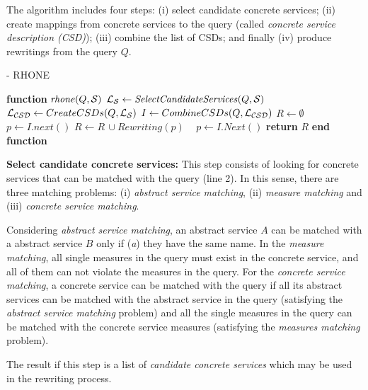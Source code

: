 The algorithm includes four steps: (i) select candidate concrete services; (ii)
create mappings from concrete services to the query (called \textit{concrete
service description (CSD)}); (iii) combine the list of CSDs; and finally (iv)
produce rewritings from the query $Q$.


\begin{algorithm}
\caption{ - RHONE}
\label{algo-rhone}

\begin{algorithmic}[1]
 
\STATE \textbf{function} $\mathit{rhone} (Q, \bigS)$
 \STATE  $\bigLS \leftarrow \mathit{SelectCandidateServices}(Q, \bigS)$ \label{rhone:buildPCD}
 \STATE  $\bigLCSD \leftarrow CreateCSDs(Q, \bigLS)$
 \STATE  $I \leftarrow CombineCSDs(Q, \bigLCSD)$
 \STATE $R\leftarrow \emptyset$
    \STATE $p \leftarrow I.next()$
  \STATE $R\leftarrow R\,\cup \mathit{Rewriting}(p)$
  \STATE ~\!
   \ENDIF
      \STATE $p \leftarrow I.\mathit{Next}()$
 \ENDWHILE
    \STATE \textbf{return} $R$
\STATE \textbf{end function}

\end{algorithmic}

\end{algorithm}


\noindent \textbf{Select candidate concrete services:} This step consists of
 looking for concrete services that can be matched with the query (line 2). In
 this sense, there are three matching problems: (i) \textit{abstract service
 matching}, (ii) \textit{measure matching} and (iii) \textit{concrete service
 matching}.
 
 Considering \textit{abstract service matching}, an abstract service $A$ can be
 matched with a abstract service $B$ only if (\textit{a}) they have the same
 name.  In the \textit{measure matching}, all single measures in the query must
 exist in the concrete service, and all of them can not violate the measures in
 the query. For the \textit{concrete service matching}, a concrete service can
 be matched with the query if all its abstract services can be matched with the
 abstract service in the query (satisfying the \textit{abstract service
 matching} problem) and all the single measures in the query can be matched with
 the concrete service measures (satisfying the \textit{measures matching} problem).


The result if this step is a list of \textit{candidate concrete services} which
 may be used in the rewriting process.


